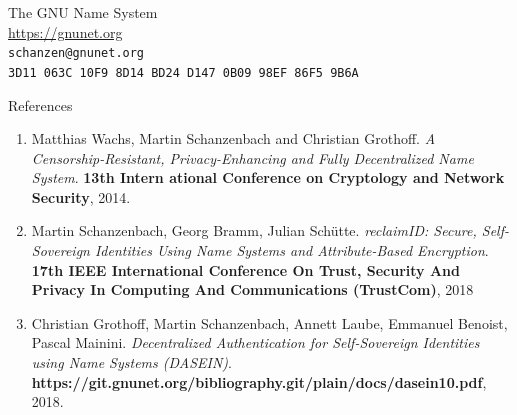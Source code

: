 \documentclass[aspectratio=169]{beamer}
\begin{document}
\begin{frame}
  \begin{center}
    The GNU Name System\\
    \vspace{2cm}
    \url{https://gnunet.org}\\
    \vspace{1em}
    {\tiny
    \texttt{schanzen@gnunet.org}\\
    \texttt{3D11~063C~10F9~8D14~BD24~D147~0B09~98EF~86F5~9B6A}\\
    }
  \end{center}
\end{frame}

\appendix

\begin{frame}{References}
  \centering
  {\small
  \begin{enumerate}
    \item {Matthias Wachs, Martin Schanzenbach and Christian Grothoff. {\em A Censorship-Resistant, Privacy-Enhancing and Fully Decentralized Name System}. {\bf 13th Intern
      ational Conference on Cryptology and Network Security}, 2014.}
    \item {Martin Schanzenbach, Georg Bramm, Julian Schütte. {\em reclaimID: Secure, Self-Sovereign Identities Using Name Systems and Attribute-Based Encryption}. {\bf 17th
      IEEE International Conference On Trust, Security And Privacy In Computing And Communications (TrustCom)}, 2018}
    \item {Christian Grothoff, Martin Schanzenbach, Annett Laube, Emmanuel Benoist, Pascal Mainini. {\em Decentralized Authentication for Self-Sovereign Identities using Name Systems (DASEIN)}. {\bf https://git.gnunet.org/bibliography.git/plain/docs/dasein10.pdf}, 2018.}
  \end{enumerate}
  }
\end{frame}
\end{document}
